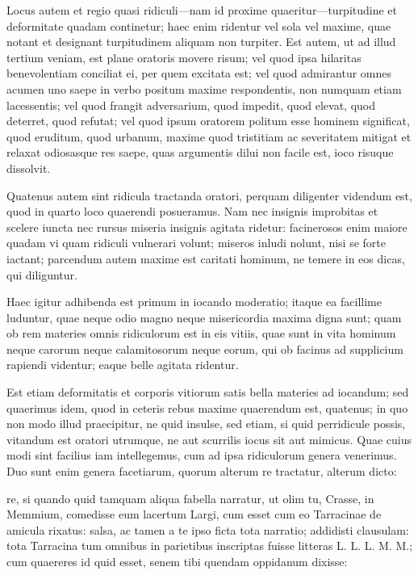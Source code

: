  Locus autem et regio quasi ridiculi—nam id proxime quaeritur—turpitudine et deformitate quadam continetur; haec enim ridentur vel sola vel maxime, quae notant et designant turpitudinem aliquam non turpiter. Est autem, ut ad illud tertium veniam, est plane oratoris movere risum; vel quod ipsa hilaritas benevolentiam conciliat ei, per quem excitata est; vel quod admirantur omnes acumen uno saepe in verbo positum maxime respondentis, non numquam etiam lacessentis; vel quod frangit adversarium, quod impedit, quod elevat, quod deterret, quod refutat; vel quod ipsum oratorem politum esse hominem significat, quod eruditum, quod urbanum, maxime quod tristitiam ac severitatem mitigat et relaxat odiosasque res saepe, quas argumentis dilui non facile est, ioco risuque dissolvit.

 Quatenus autem sint ridicula tractanda oratori, perquam diligenter videndum est, quod in quarto loco quaerendi posueramus. Nam nec insignis improbitas et scelere iuncta nec rursus miseria insignis agitata ridetur: facinerosos enim maiore quadam vi quam ridiculi vulnerari volunt; miseros inludi nolunt, nisi se forte iactant; parcendum autem maxime est caritati hominum, ne temere in eos dicas, qui diliguntur.

 Haec igitur adhibenda est primum in iocando moderatio; itaque ea facillime luduntur, quae neque odio magno neque misericordia maxima digna sunt; quam ob rem materies omnis ridiculorum est in eis vitiis, quae sunt in vita hominum neque carorum neque calamitosorum neque eorum, qui ob facinus ad supplicium rapiendi videntur; eaque belle agitata ridentur.

 Est etiam deformitatis et corporis vitiorum satis bella materies ad iocandum; sed quaerimus idem, quod in ceteris rebus maxime quaerendum est, quatenus; in quo non modo illud praecipitur, ne quid insulse, sed etiam, si quid perridicule possis, vitandum est oratori utrumque, ne aut scurrilis iocus sit aut mimicus. Quae cuius modi sint facilius iam intellegemus, cum ad ipsa ridiculorum genera venerimus. Duo sunt enim genera facetiarum, quorum alterum re tractatur, alterum dicto:

 re, si quando quid tamquam aliqua fabella narratur, ut olim tu, Crasse, in Memmium, comedisse eum lacertum Largi, cum esset cum eo Tarracinae de amicula rixatus: salsa, ac tamen a te ipso ficta tota narratio; addidisti clausulam: tota Tarracina tum omnibus in parietibus inscriptas fuisse litteras L. L. L. M. M.; cum quaereres id quid esset, senem tibi quendam oppidanum dixisse:

